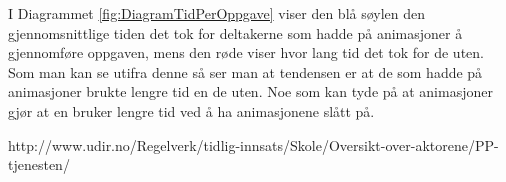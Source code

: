 I Diagrammet \ref{fig:DiagramTidPerOppgave} viser den blå søylen den gjennomsnittlige tiden det tok for deltakerne som hadde på animasjoner å gjennomføre oppgaven, mens den røde viser hvor lang tid det tok for de uten. Som man kan se utifra denne så ser man at tendensen er at de som hadde på animasjoner brukte lengre tid en de uten. Noe som kan tyde på at animasjoner gjør at en bruker lengre tid ved å ha animasjonene slått på. 







http://www.udir.no/Regelverk/tidlig-innsats/Skole/Oversikt-over-aktorene/PP-tjenesten/ 